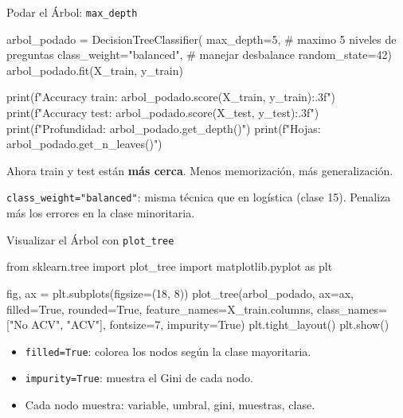 \documentclass[aspectratio=169, 11pt]{beamer}
\begin{document}
\begin{frame}[fragile,shrink=18]{Podar el Árbol: \texttt{max\_depth}}
  \vspace{-6pt}
  \begin{pyblock}
arbol_podado = DecisionTreeClassifier(
    max_depth=5,               # maximo 5 niveles de preguntas
    class_weight="balanced",   # manejar desbalance
    random_state=42)
arbol_podado.fit(X_train, y_train)

print(f"Accuracy train: {arbol_podado.score(X_train, y_train):.3f}")
print(f"Accuracy test:  {arbol_podado.score(X_test, y_test):.3f}")
print(f"Profundidad:    {arbol_podado.get_depth()}")
print(f"Hojas:          {arbol_podado.get_n_leaves()}")
  \end{pyblock}

  \vspace{4pt}
  {\scriptsize\color{arcaDark}
    \faArrowRight\hspace{4pt} Ahora train y test están \textbf{más cerca}.
    Menos memorización, más generalización.}

  \vspace{4pt}
  {\scriptsize\color{textMuted}
    \faKey\hspace{4pt} \texttt{class\_weight="balanced"}: misma técnica que en
    logística (clase 15). Penaliza más los errores en la clase minoritaria.}
\end{frame}

\begin{frame}[fragile,shrink=15]{Visualizar el Árbol con \texttt{plot\_tree}}
  \vspace{-6pt}
  \begin{pyblock}
from sklearn.tree import plot_tree
import matplotlib.pyplot as plt

fig, ax = plt.subplots(figsize=(18, 8))
plot_tree(arbol_podado, ax=ax, filled=True, rounded=True,
          feature_names=X_train.columns,
          class_names=["No ACV", "ACV"],
          fontsize=7, impurity=True)
plt.tight_layout()
plt.show()
  \end{pyblock}

  \vspace{4pt}
  {\scriptsize\color{textMuted}
  \begin{itemize}\setlength{\itemsep}{3pt}
    \item[{\color{arcaRed}\scriptsize\faArrowRight}]
      \texttt{filled=True}: colorea los nodos según la clase mayoritaria.
    \item[{\color{arcaRed}\scriptsize\faArrowRight}]
      \texttt{impurity=True}: muestra el Gini de cada nodo.
    \item[{\color{arcaRed}\scriptsize\faArrowRight}]
      Cada nodo muestra: variable, umbral, gini, muestras, clase.
  \end{itemize}
  }
\end{frame}
\end{document}

